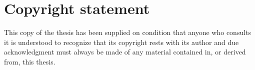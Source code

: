 
\section*{Copyright statement}
\label{sec:copyrights}
This copy of the thesis has been supplied on condition that anyone who consults it is understood to recognize that its copyright rests with its author and due acknowledgment must always be made of any material contained in, or derived from, this thesis.
\pagebreak